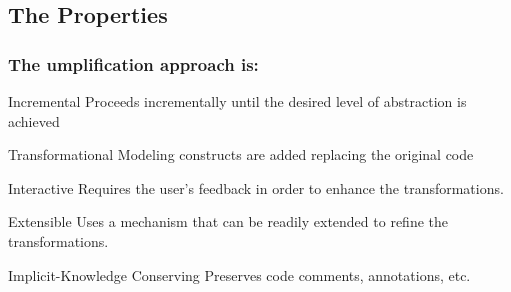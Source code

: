\documentclass[xcolor=table]{beamer}
\begin{document}
\subsection{The Properties} 
\begin{frame}
\frametitle{The umplification approach is:}

\begin{block}{Incremental}
Proceeds incrementally until the desired level of abstraction is achieved
\end{block}

\begin{block}{Transformational}
Modeling constructs are added replacing the original code
\end{block}

\begin{block}{Interactive}
 Requires the user’s feedback in order to enhance the transformations.
\end{block}

\begin{block}{Extensible}
Uses a mechanism that can be readily extended to refine the transformations. 
\end{block}

\begin{block}{Implicit-Knowledge Conserving}
Preserves code comments, annotations, etc.
\end{block}
\end{frame}
\end{document}
